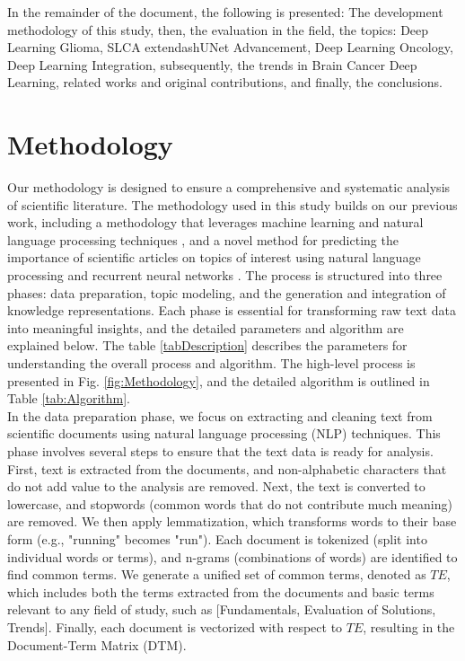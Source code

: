\documentclass[runningheads]{llncs}
\begin{document}
In the remainder of the document, the following is presented: The development methodology of this study, then, the evaluation in the field, the topics: Deep Learning Glioma, SLCA	extendash{}UNet Advancement, Deep Learning Oncology, Deep Learning Integration,  subsequently, the trends in Brain Cancer Deep Learning, related works and original contributions, and finally, the conclusions.
\section{Methodology}

Our methodology is designed to ensure a comprehensive and systematic analysis of scientific literature. The methodology used in this study builds on our previous work, including a methodology that leverages machine learning and natural language processing techniques \cite{Hurtado2023}, and a novel method for predicting the importance of scientific articles on topics of interest using natural language processing and recurrent neural networks \cite{Lopez2024}. The process is structured into three phases: data preparation, topic modeling, and the generation and integration of knowledge representations. Each phase is essential for transforming raw text data into meaningful insights, and the detailed parameters and algorithm are explained below. The table \ref{tabDescription} describes the parameters for understanding the overall process and algorithm. The high-level process is presented in Fig. \ref{fig:Methodology}, and the detailed algorithm is outlined in Table \ref{tab:Algorithm}.\\ 

In the data preparation phase, we focus on extracting and cleaning text from scientific documents using natural language processing (NLP) techniques. This phase involves several steps to ensure that the text data is ready for analysis. First, text is extracted from the documents, and non-alphabetic characters that do not add value to the analysis are removed. Next, the text is converted to lowercase, and stopwords (common words that do not contribute much meaning) are removed. We then apply lemmatization, which transforms words to their base form (e.g., "running" becomes "run"). Each document is tokenized (split into individual words or terms), and n-grams (combinations of words) are identified to find common terms. We generate a unified set of common terms, denoted as $TE$, which includes both the terms extracted from the documents and basic terms relevant to any field of study, such as [Fundamentals, Evaluation of Solutions, Trends]. Finally, each document is vectorized with respect to $TE$, resulting in the Document-Term Matrix (DTM).\\
\end{document}
